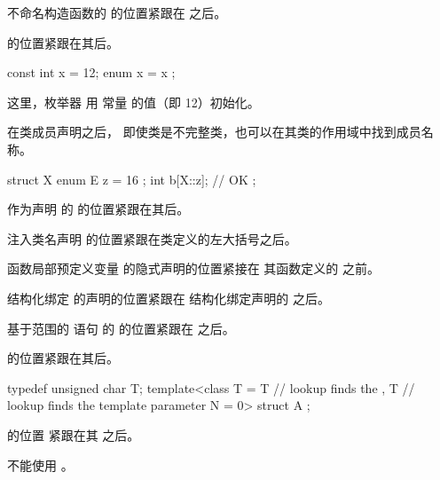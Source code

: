 \pnum
不命名构造函数的 
的位置紧跟在  之后。

\pnum
{} 的位置紧跟在其后。
\begin{example}
\begin{codeblock}
const int x = 12;
{ enum { x = x }; }
\end{codeblock}
这里，枚举器  用
常量  的值（即 12）初始化。
\end{example}

\pnum
\begin{note}
%
在类成员声明之后，
即使类是不完整类，也可以在其类的作用域中找到成员名称。
\begin{example}
\begin{codeblock}
struct X {
  enum E { z = 16 };
  int b[X::z];          // OK
};
\end{codeblock}
\end{example}
\end{note}

\pnum
作为声明 的 
的位置紧跟在其后。

\pnum
注入类名声明
的位置紧跟在类定义的左大括号之后。

\pnum
函数局部预定义变量
的隐式声明的位置紧接在
其函数定义的  之前。

\pnum
结构化绑定
的声明的位置紧跟在
结构化绑定声明的  之后。

\pnum
基于范围的  语句 的 
的位置紧跟在  之后。

\pnum
{} 的位置紧跟在其后。
\begin{example}
\begin{codeblock}
typedef unsigned char T;
template<class T
  = T               // lookup finds the 
  , T               // lookup finds the template parameter
    N = 0> struct A { };
\end{codeblock}
\end{example}

\pnum
{} 的位置
紧跟在其  之后。
\begin{note}
 不能使用
。
\end{note}

